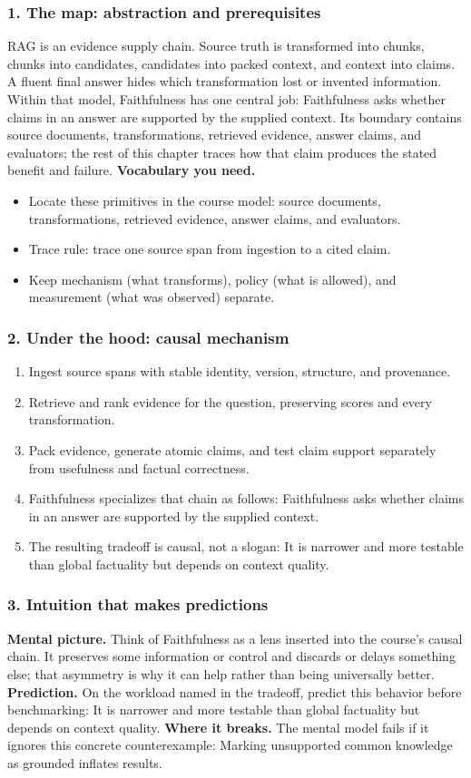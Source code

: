 \subsubsection*{1. The map: abstraction and prerequisites}
RAG is an evidence supply chain. Source truth is transformed into chunks, chunks into candidates, candidates into packed context, and context into claims. A fluent final answer hides which transformation lost or invented information.
Within that model, Faithfulness has one central job: Faithfulness asks whether claims in an answer are supported by the supplied context. Its boundary contains source documents, transformations, retrieved evidence, answer claims, and evaluators; the rest of this chapter traces how that claim produces the stated benefit and failure.
\textbf{Vocabulary you need.}\begin{itemize}
\item Locate these primitives in the course model: source documents, transformations, retrieved evidence, answer claims, and evaluators.
\item Trace rule: trace one source span from ingestion to a cited claim.
\item Keep mechanism (what transforms), policy (what is allowed), and measurement (what was observed) separate.
\end{itemize}
\subsubsection*{2. Under the hood: causal mechanism}\begin{enumerate}
\item Ingest source spans with stable identity, version, structure, and provenance.
\item Retrieve and rank evidence for the question, preserving scores and every transformation.
\item Pack evidence, generate atomic claims, and test claim support separately from usefulness and factual correctness.
\item Faithfulness specializes that chain as follows: Faithfulness asks whether claims in an answer are supported by the supplied context.
\item The resulting tradeoff is causal, not a slogan: It is narrower and more testable than global factuality but depends on context quality.
\end{enumerate}
\subsubsection*{3. Intuition that makes predictions}
\textbf{Mental picture.} Think of Faithfulness as a lens inserted into the course's causal chain. It preserves some information or control and discards or delays something else; that asymmetry is why it can help rather than being universally better.
\textbf{Prediction.} On the workload named in the tradeoff, predict this behavior before benchmarking: It is narrower and more testable than global factuality but depends on context quality.
\textbf{Where it breaks.} The mental model fails if it ignores this concrete counterexample: Marking unsupported common knowledge as grounded inflates results.
